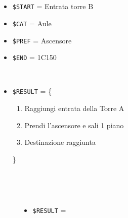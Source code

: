\documentclass[../../SperimentazioniPratiche.tex]{subfiles}
\begin{document}
			\paragraph*{}
			\label{2Prova2B.1}	
			\begin{tcolorbox}[fonttitle=\bfseries, 
								adjusted title={\Large Prova 2B.1}, 
								breakable, 
								sharp corners=south,
								colback=white, 
								colframe=white!60!black]
								
				\begin{description}[leftmargin=0.7cm,labelwidth=!]
				
					\item[Input] \ \par 
        				\begin{itemize}
        					\item \verb|$START| = Entrata torre B
							\item \verb|$CAT| = Aule
							\item \verb|$PREF| = Ascensore
        					\item \verb|$END| = 1C150
        				\end{itemize}
        				
        			\tcbline 
        				
        			\item[Output atteso] \ \par
        				\begin{itemize}
        					\item \verb|$RESULT| = \{
        					\begin{enumerate}
        						\item Raggiungi entrata della Torre A
        						\item Prendi l'ascensore e sali 1 piano
        						\item Destinazione raggiunta
        					\end{enumerate}
        					\}
        				\end{itemize}

					\tcbline        				
        				
        			\item[Output riscontrato] \ \par
        				\begin{description}
        				
        					\item[\dispositivoA] \ \par
        					\begin{itemize}
        						\item \verb|$RESULT| = \ok
        					\end{itemize}      					
        					

\end{description}
\end{description}
\end{tcolorbox}
\end{document}
